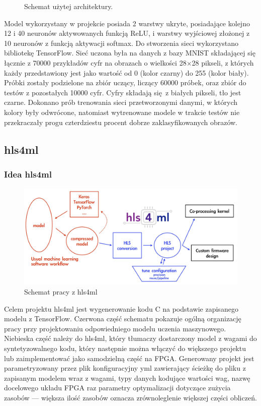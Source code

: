 \documentclass[12pt, oneside, a4paper]{article}
\def\CPP{{C\nolinebreak[4]\hspace{-.05em}\raisebox{.4ex}{\tiny\bf ++}}}
\begin{document}
\begin{figure}[h]
  \centering
  
  \caption{Schemat użytej architektury.
  }\label{fig:nn-scheme}
\end{figure}
Model wykorzystany w projekcie posiada 2 warstwy ukryte, posiadające kolejno
12 i 40 neuronów aktywowanych funkcją ReLU, i warstwy wyjściowej złożonej
z 10 neuronów z funkcją aktywacji softmax. Do stworzenia sieci wykorzystano
bibliotekę TensorFlow. Sieć uczona była na danych
z bazy MNIST składającej się łącznie z 70000 przykładów
cyfr na obrazach o wielkości 28\(\times \)28 pikseli, z których każdy
przedstawiony jest jako wartość od 0 (kolor czarny) do 255 (kolor biały).
Próbki zostały
podzielone na zbiór uczący, liczący 60000 próbek, oraz zbiór do testów
z pozostałych 10000 cyfr. Cyfry składają się z białych pikseli, tło jest czarne.
Dokonano prób trenowania sieci przetworzonymi danymi, w których kolory były
odwrócone, natomiast wytrenowane modele w trakcie testów nie przekraczały
progu czterdziestu procent dobrze zaklasyfikowanych obrazów.

\subsection{hls4ml}
\subsubsection{Idea hls4ml}
\begin{figure}[h]
  \centering
  \includegraphics[scale=0.2]{figures/hls4ml.jpg}
  \caption{Schemat pracy z hls4ml}\label{fig:hls4ml}
\end{figure}
Celem projektu hls4ml jest wygenerowanie kodu \CPP{} na podstawie zapisanego
modelu z TensorFlow.
Czerwona część schematu pokazuje ogólną organizację pracy przy projektowaniu 
odpowiedniego modelu uczenia maszynowego. Niebieska część należy do hls4ml,
który tłumaczy dostarczony model z wagami do syntetyzowalnego kodu, który
następnie można włączyć do większego projektu lub zaimplementować jako
samodzielną część na FPGA. Generowany projekt jest parametryzowany
przez plik konfiguracyjny yml zawierający ścieżkę do pliku z zapisanym modelem
wraz z wagami, typy danych kodujące wartości wag, nazwę docelowego układu FPGA
raz parametry optymalizacji dotyczące zużycia zasobów --- większa ilość
zasobów oznacza zrównoleglenie większej części obliczeń.
\end{document}
